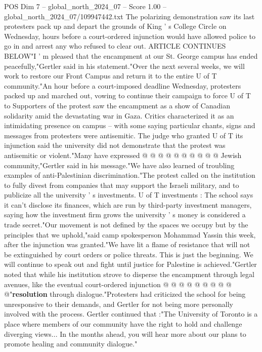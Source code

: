 \begin{textsample}{POS Dim 7 – global\_north\_2024\_07 – Score 1.00 – global\_north\_2024\_07/109947442.txt}  \label{ex:f7_pos_338}
The polarizing demonstration saw its last protesters pack up and depart the grounds of King ' s College Circle on Wednesday, hours before a court-ordered injunction would have allowed police to go in and arrest any who refused to clear out.
ARTICLE CONTINUES BELOW"I ' m pleased that the encampment at our St.
George campus has ended peacefully,"Gertler said in his statement."Over the next several weeks, we will work to restore our Front Campus and return it to the entire U of T community."An hour before a court-imposed deadline Wednesday, protesters packed up and marched out, vowing to continue their campaign to force U of T to Supporters of the protest saw the encampment as a show of Canadian solidarity amid the devastating war in Gaza.
Critics characterized it as an intimidating presence on campus -- with some saying particular chants, signs and messages from protesters were antisemitic.
The judge who granted U of T its injunction said the university did not demonstrate that the protest was antisemitic or violent."Many have expressed @ @ @ @ @ @ @ @ @ @ Jewish community,"Gertler said in his message."We have also learned of troubling examples of anti-Palestinian discrimination."The protest called on the institution to fully divest from companies that may support the Israeli military, and to publicize all the university ' s investments.
U of T investments : The school says it can't disclose its finances, which are run by third-party investment managers, saying how the investment firm grows the university ' s money is considered a trade secret."Our movement is not defined by the spaces we occupy but by the principles that we uphold,"said camp spokesperson Mohammad Yassin this week, after the injunction was granted."We have lit a flame of resistance that will not be extinguished by court orders or police threats.
This is just the beginning.
We will continue to speak out and fight until justice for Palestine is achieved."Gertler noted that while his institution strove to disperse the encampment through legal avenues, like the eventual court-ordered injunction @ @ @ @ @ @ @ @ @ @"\textbf{resolution} through dialogue."Protesters had criticized the school for being unresponsive to their demands, and Gertler for not being more personally involved with the process.
Gertler continued that :"The University of Toronto is a place where members of our community have the right to hold and challenge diverging views...
In the months ahead, you will hear more about our plans to promote healing and community dialogue."

\end{textsample}
